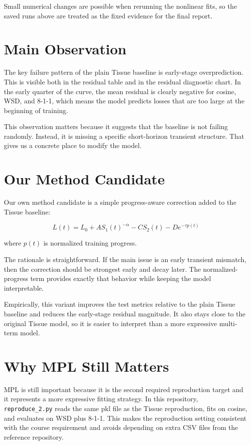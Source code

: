 ﻿\documentclass[11pt]{article}
\begin{document}
Small numerical changes are possible when rerunning the nonlinear fits, so the saved runs above are treated as the fixed evidence for the final report.

\section{Main Observation}

The key failure pattern of the plain Tissue baseline is early-stage overprediction. This is visible both in the residual table and in the residual diagnostic chart. In the early quarter of the curve, the mean residual is clearly negative for cosine, WSD, and 8-1-1, which means the model predicts losses that are too large at the beginning of training.

This observation matters because it suggests that the baseline is not failing randomly. Instead, it is missing a specific short-horizon transient structure. That gives us a concrete place to modify the model.

\section{Our Method Candidate}

Our own method candidate is a simple progress-aware correction added to the Tissue baseline:

\[
L(t) = L_0 + A S_1(t)^{-\alpha} - C S_2(t) - D e^{-\tau p(t)}
\]

where $p(t)$ is normalized training progress.

The rationale is straightforward. If the main issue is an early transient mismatch, then the correction should be strongest early and decay later. The normalized-progress term provides exactly that behavior while keeping the model interpretable.

Empirically, this variant improves the test metrics relative to the plain Tissue baseline and reduces the early-stage residual magnitude. It also stays close to the original Tissue model, so it is easier to interpret than a more expressive multi-term model.

\section{Why MPL Still Matters}

MPL is still important because it is the second required reproduction target and it represents a more expressive fitting strategy. In this repository, \texttt{reproduce\_2.py} reads the same pkl file as the Tissue reproduction, fits on cosine, and evaluates on WSD plus 8-1-1. This makes the reproduction setting consistent with the course requirement and avoids depending on extra CSV files from the reference repository.
\end{document}
